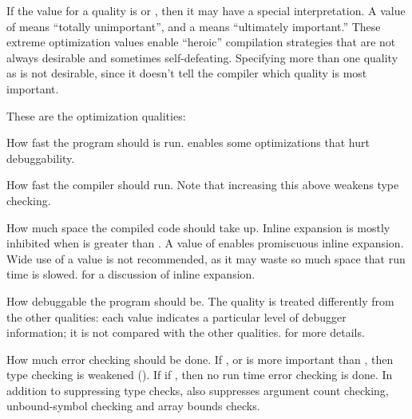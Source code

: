 If the value for a quality is  or , then it may have a
special interpretation.  A value of  means ``totally
unimportant'', and a  means ``ultimately important.''  These
extreme optimization values enable ``heroic'' compilation strategies
that are not always desirable and sometimes self-defeating.
Specifying more than one quality as  is not desirable, since
it doesn't tell the compiler which quality is most important.


These are the optimization qualities:
\begin{Lentry}
  
\item[\code{speed}] How fast the
  program should is run.   enables some optimizations
  that hurt debuggability.
  
\item[\code{compilation-speed}] How fast the compiler should run.  Note that increasing
  this above  weakens type checking.
  
\item[\code{space}] How much space
  the compiled code should take up.  Inline expansion is mostly
  inhibited when  is greater than .  A value
  of  enables promiscuous inline expansion.  Wide use of a
   value is not recommended, as it may waste so much space
  that run time is slowed.   for a discussion
  of inline expansion.
  
\item[\code{debug}] How debuggable
  the program should be.  The quality is treated differently from the
  other qualities: each value indicates a particular level of debugger
  information; it is not compared with the other qualities.
   for more details.
  
\item[\code{safety}] How much
  error checking should be done.  If ,  or
   is more important than , then
  type checking is weakened ().  If
   if , then no run time error checking is done.
  In addition to suppressing type checks,  also suppresses
  argument count checking, unbound-symbol checking and array bounds
  checks.
  

\end{Lentry}
